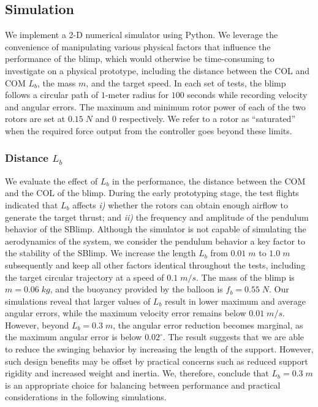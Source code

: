 \documentclass[conference]{ieeeconf}
\begin{document}


\subsection{Simulation}
We implement a 2-D numerical simulator using Python. We leverage the convenience of manipulating various physical factors that influence the performance of the blimp, which would otherwise be time-consuming to investigate on a physical prototype, including the distance between the COL and COM $L_b$, the mass $m$, and the target speed. In each set of tests, the blimp follows a circular path of $1$-meter radius for $100$ seconds while recording velocity and angular errors. The maximum and minimum rotor power of each of the two rotors are set at $0.15\; N$ and $0$ respectively. We refer to a rotor as ``saturated'' when the required force output from the controller goes beyond these limits.

\subsubsection{Distance $L_b$} We evaluate the effect of $L_b$ in the performance, the distance between the COM and the COL of the blimp. During the early prototyping stage, the test flights indicated that $L_b$ affects \textit{i)} whether the rotors can obtain enough airflow to generate the target thrust; and \textit{ii)} the frequency and amplitude of the pendulum behavior of the SBlimp. Although the simulator is not capable of simulating the aerodynamics of the system, we consider the pendulum behavior a key factor to the stability of the SBlimp. We increase the length $L_b$ from $0.01\; m$ to $1.0\; m$ subsequently and keep all other factors identical throughout the tests, including the target circular trajectory at a speed of $0.1\; m/s$. The mass of the blimp is $m = 0.06\; kg$, and the buoyancy provided by the balloon is $f_b = 0.55\; N$. 
Our simulations reveal that larger values of $L_b$ result in lower maximum and average angular errors, while the maximum velocity error remains below $0.01\; m/s$. However, beyond $L_b = 0.3\; m$, the angular error reduction becomes marginal, as the maximum angular error is below $0.02^\circ$. The result suggests that we are able to reduce the swinging behavior by increasing the length of the support. However, such design benefits may be offset by practical concerns such as reduced support rigidity and increased weight and inertia. We, therefore, conclude that $L_b = 0.3\; m$ is an appropriate choice for balancing between performance and practical considerations in the following simulations. 
\end{document}

